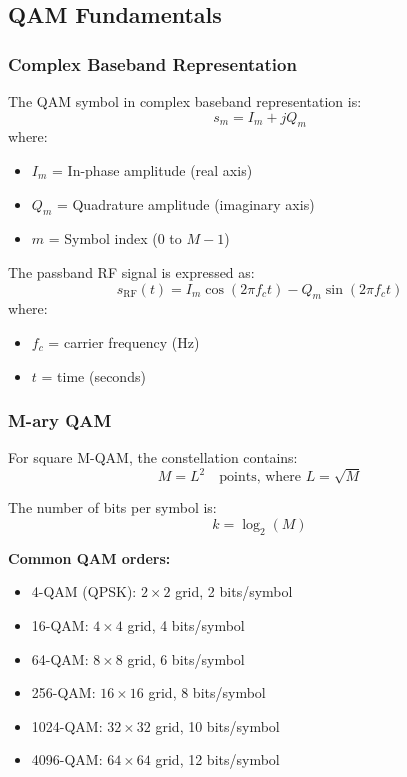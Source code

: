 \subsection{QAM Fundamentals}

\subsubsection{Complex Baseband Representation}

The QAM symbol in complex baseband representation is:
\begin{equation}
s_m = I_m + jQ_m
\label{eq:qam-symbol}
\end{equation}
where:
\begin{itemize}
\item $I_m$ = In-phase amplitude (real axis)
\item $Q_m$ = Quadrature amplitude (imaginary axis)
\item $m$ = Symbol index ($0$ to $M-1$)
\end{itemize}

The passband RF signal is expressed as:
\begin{equation}
s_{\text{RF}}(t) = I_m \cos(2\pi f_c t) - Q_m \sin(2\pi f_c t)
\label{eq:qam-passband}
\end{equation}
where:
\begin{itemize}
\item $f_c$ = carrier frequency (Hz)
\item $t$ = time (seconds)
\end{itemize}

\subsubsection{M-ary QAM}

For square M-QAM, the constellation contains:
\begin{equation}
M = L^2 \quad \text{points, where } L = \sqrt{M}
\label{eq:qam-m}
\end{equation}

The number of bits per symbol is:
\begin{equation}
k = \log_2(M)
\label{eq:qam-bits}
\end{equation}

\textbf{Common QAM orders:}
\begin{itemize}
\item 4-QAM (QPSK): $2 \times 2$ grid, 2 bits/symbol
\item 16-QAM: $4 \times 4$ grid, 4 bits/symbol
\item 64-QAM: $8 \times 8$ grid, 6 bits/symbol
\item 256-QAM: $16 \times 16$ grid, 8 bits/symbol
\item 1024-QAM: $32 \times 32$ grid, 10 bits/symbol
\item 4096-QAM: $64 \times 64$ grid, 12 bits/symbol
\end{itemize}

